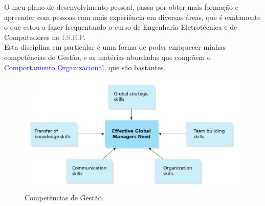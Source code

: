 O meu plano de desenvolvimento pessoal, passa por obter mais formação e apreender com pessoas com mais experiência em diversas áreas, que é exatamente o que estou a fazer frequentando o curso de Engenharia Eletrotécnica e de Computadores no \textcolor{gray}{I.S.E.P}.\\
Esta disciplina em particular é uma forma de poder enriquecer minhas competências de Gestão, e as matérias abordadas que compõem o \textcolor{blue}{Comportamento Organizacional}, que são bastantes.
\begin{figure}[H]
	\begin{minipage}{\linewidth}
		\centering
		\includegraphics[scale=0.3]{"./image/Skills/Managerial Skills for the Global Marketplace.jpg"}
	\end{minipage}
	\caption{Competências de Gestão. \cite{book_6}}
\end{figure}

